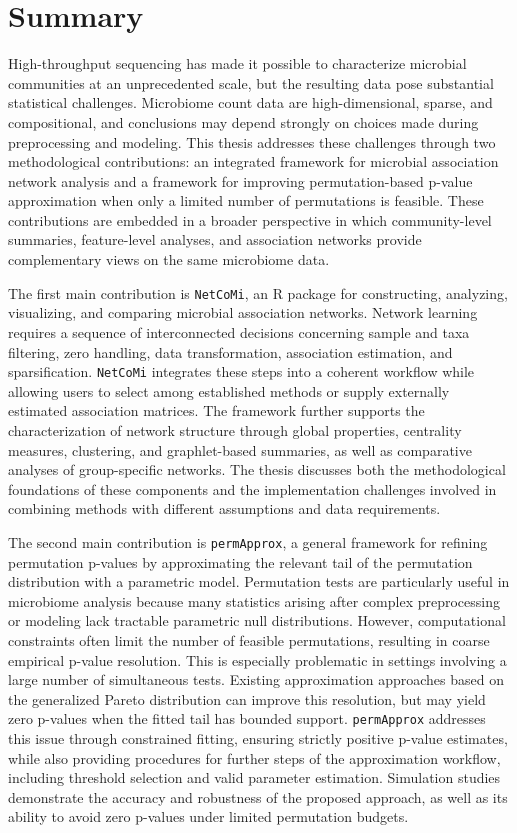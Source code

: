 \chapter*{Summary}

High-throughput sequencing has made it possible to characterize microbial communities at an unprecedented scale, but the resulting data pose substantial statistical challenges. Microbiome count data are high-dimensional, sparse, and compositional, and conclusions may depend strongly on choices made during preprocessing and modeling. This thesis addresses these challenges through two methodological contributions: an integrated framework for microbial association network analysis and a framework for improving permutation-based p-value approximation when only a limited number of permutations is feasible. These contributions are embedded in a broader perspective in which community-level summaries, feature-level analyses, and association networks provide complementary views on the same microbiome data.

The first main contribution is \texttt{NetCoMi}, an R package for constructing, analyzing, visualizing, and comparing microbial association networks. Network learning requires a sequence of interconnected decisions concerning sample and taxa filtering, zero handling, data transformation, association estimation, and sparsification. \texttt{NetCoMi} integrates these steps into a coherent workflow while allowing users to select among established methods or supply externally estimated association matrices. The framework further supports the characterization of network structure through global properties, centrality measures, clustering, and graphlet-based summaries, as well as comparative analyses of group-specific networks. The thesis discusses both the methodological foundations of these components and the implementation challenges involved in combining methods with different assumptions and data requirements.

The second main contribution is \texttt{permApprox}, a general framework for refining permutation p-values by approximating the relevant tail of the permutation distribution with a parametric model. Permutation tests are particularly useful in microbiome analysis because many statistics arising after complex preprocessing or modeling lack tractable parametric null distributions. However, computational constraints often limit the number of feasible permutations, resulting in coarse empirical p-value resolution. This is especially problematic in settings involving a large number of simultaneous tests. Existing approximation approaches based on the generalized Pareto distribution can improve this resolution, but may yield zero p-values when the fitted tail has bounded support. \texttt{permApprox} addresses this issue through constrained fitting, ensuring strictly positive p-value estimates, while also providing procedures for further steps of the approximation workflow, including threshold selection and valid parameter estimation. Simulation studies demonstrate the accuracy and robustness of the proposed approach, as well as its ability to avoid zero p-values under limited permutation budgets.

